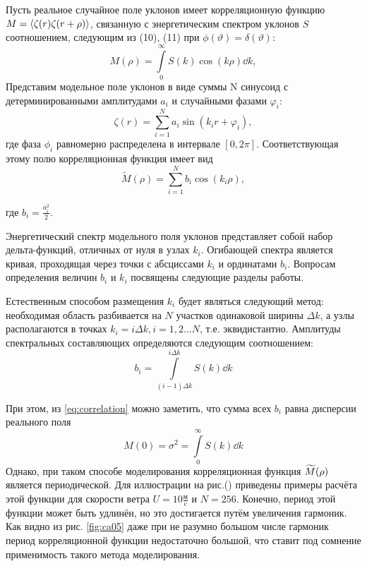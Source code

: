Пусть реальное случайное поле уклонов имеет корреляционную функцию $M=\langle\zeta(r) \zeta(r+\rho)\rangle$, связанную с энергетическим спектром уклонов $S$ соотношением, следующим из (10), (11) при $\phi(\vartheta)=\delta(\vartheta)$:
\begin{equation}
	\label{eq:correlation}
	M(\rho)= \int\limits_0^{\infty} S(k)\cos(k \rho) \dd{k}, 
\end{equation}
Представим модельное поле уклонов в виде суммы N синусоид с детерминированными амплитудами $a_i$ и случайными фазами $\varphi_i$:
\begin{equation}
	\zeta(r)=\sum_{i=1}^N a_i \sin(k_ir+\varphi_i), 
\end{equation}
где фаза $\phi_i$ равномерно распределена в интервале $[0,2\pi]$. Соответствующая этому полю корреляционная функция имеет вид
\begin{equation}
	\widetilde M(\rho)=\sum\limits_{i=1}^N b_i \cos(k_i \rho),
\end{equation}

где $b_i=\frac{a_i^2}{2}$.

Энергетический спектр модельного поля уклонов представляет собой набор дельта-функций, отличных от нуля в узлах $k_i$. Огибающей спектра является кривая, проходящая через точки с абсциссами $k_i$ и ординатами $b_i$. Вопросам определения величин $b_i$ и $k_i$ 
посвящены следующие разделы работы.

Естественным способом размещения $k_i$ будет являться следующий метод:
необходимая область разбивается на $N$ участков одинаковой ширины $\Delta k$, а узлы располагаются в точках $k_i=i \Delta k, i=1,2\dots N$, т.е. эквидистантно.
Амплитуды спектральных составляющих определяются следующим соотношением:
\begin{equation}
	b_i = \int\limits_{(i-1)\Delta k}^{i \Delta k} S(k) \dd{k}
\end{equation}

При этом, из \eqref{eq:correlation} можно заметить, что сумма всех $b_i$ равна дисперсии реального поля
\begin{equation}
	M(0)=\sigma^2=\int\limits_0^{\infty} S(k) \dd{k}
\end{equation}
Однако, при таком способе моделирования корреляционная функция $\widetilde{M}(\rho)$ является
периодической. Для иллюстрации на рис.() приведены примеры расчёта этой функции для скорости ветра $U=10 \frac{\text{м}}{\text{c}}$ и $N=256$. Конечно, период этой функции может быть удлинён, но это достигается путём увеличения гармоник.
Как видно из рис. \ref{fig:ca05} даже при не разумно большом числе гармоник период корреляционной функции недостаточно большой, что ставит под сомнение применимость такого метода моделирования.


